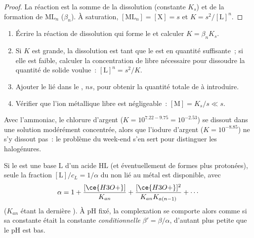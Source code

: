 \begin{proof}
La réaction est la somme de la dissolution (constante $K_s$) et de la
formation de $\mathrm{ML}_n$ ($\beta_n$). À saturation,
$[\mathrm{ML}_n]
= [\mathrm{X}] = s$ et $K = s^2/[\mathrm{L}]^n$.
\end{proof}

\begin{method}\label{met:b1:complexation:dissolve-precipitate}
\begin{enumerate}
  \item Écrire la réaction de dissolution qui forme le  et
        calculer $K = \beta_n K_s$.
  \item Si $K$ est grande, la dissolution est  tant que le
         est en quantité suffisante~; si elle est faible, calculer
        la concentration de  libre nécessaire pour dissoudre la
        quantité de solide voulue~:
        $[\mathrm{L}]^n = s^2/K$.
  \item Ajouter le  lié dans le , $n s$, pour obtenir la
        quantité totale de  à introduire.
  \item Vérifier que l'ion métallique libre est négligeable~:
        $[\mathrm{M}] = K_s/s
        \ll s$.
\end{enumerate}
\end{method}

Avec l'ammoniac, le chlorure d'argent ($K = 10^{7.22 - 9.75} = 10^{-2.53}$)
se dissout dans une solution modérément concentrée, alors que l'iodure
d'argent ($K = 10^{-8.85}$) ne s'y dissout pas~: le problème du week-end
s'en sert pour distinguer les halogénures.

\begin{proposition}\label{prop:b1:complexation:ligand-acidity}
Si le  est une base $\mathrm{L}$ d'un acide $\mathrm{HL}$ (et
éventuellement de formes plus protonées), seule la fraction
$[\mathrm{L}]/c_L =
1/\alpha$ du  non lié au métal est disponible, avec
\[
  \alpha = 1 + \frac{[\ce{H3O+}]}{K_{an}} + \frac{[\ce{H3O+}]^2}{K_{an}K_{a(n-1)}}
  + \cdots
\]
($K_{an}$ étant la dernière ). À pH fixé, la
complexation se comporte alors comme si sa constante était la constante
\emph{conditionnelle} $\beta' = \beta/\alpha$, d'autant plus petite que
le pH est bas.
\end{proposition}

